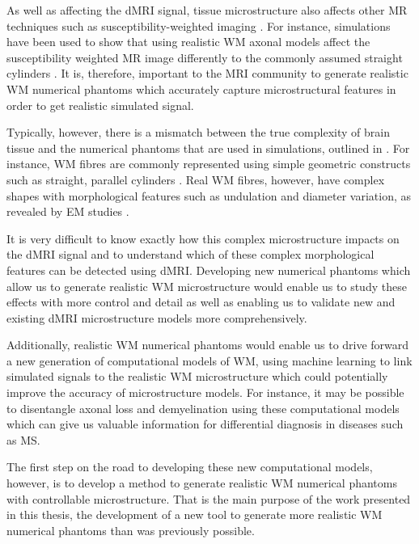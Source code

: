 As well as affecting the dMRI signal, tissue microstructure also affects other MR techniques such as susceptibility-weighted imaging \cite{Li2012,Lee2010}. For instance, simulations have been used to show that using realistic \ac{WM} axonal models affect the susceptibility weighted MR image differently to the commonly assumed straight cylinders \cite{Xu2018}.
It is, therefore, important to the MRI community to generate realistic \ac{WM} numerical phantoms which accurately capture microstructural features in order to get realistic simulated signal.

Typically, however, there is a mismatch between the true complexity of brain tissue and the numerical phantoms that are used in simulations, outlined in .
For instance, \ac{WM} fibres are commonly represented using simple geometric constructs such as straight, parallel cylinders \cite{Nilsson2010,Fieremans2010,Nilsson2009,Ford1997,Hall2009,Alexander2010}. Real \ac{WM} fibres, however, have complex shapes with morphological features such as undulation and diameter variation, as revealed by \ac{EM} studies \cite{Abdollahzadeh2019, Lee2019b}.

It is very difficult to know exactly how this complex microstructure impacts on the \ac{dMRI} signal and to understand which of these complex morphological features can be detected using \ac{dMRI}.
Developing new numerical phantoms which allow us to generate realistic \ac{WM} microstructure would enable us to study these effects with more control and detail as well as enabling us to validate new and existing \ac{dMRI} microstructure models more comprehensively.

Additionally, realistic \ac{WM} numerical phantoms would enable us to drive forward a new generation of computational models of \ac{WM}, using machine learning to link simulated signals to the realistic \ac{WM} microstructure which could potentially improve the accuracy of microstructure models. For instance, it may be possible to disentangle axonal loss and demyelination using these computational models which can give us valuable information for differential diagnosis in diseases such as \ac{MS}.

The first step on the road to developing these new computational models, however, is to develop a method to generate realistic \ac{WM} numerical phantoms with controllable microstructure. That is the main purpose of the work presented in this thesis, the development of a new tool to generate more realistic \ac{WM} numerical phantoms than was previously possible.


